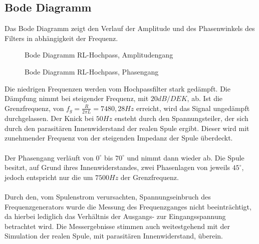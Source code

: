 \subsection{Bode Diagramm}
Das Bode Diagramm zeigt den Verlauf der Amplitude und des Phasenwinkels des Filters in abhängigkeit der Frequenz.
\begin{figure}[H]
  \centering
  \caption{Bode Diagramm RL-Hochpass, Amplitudengang}
\end{figure}
\begin{figure}[H]
  \centering
  \caption{Bode Diagramm RL-Hochpass, Phasengang}
\end{figure}
\noindent
Die niedrigen Frequenzen werden vom Hochpassfilter stark gedämpft. Die Dämpfung nimmt bei steigender Frequenz, mit $20dB/DEK$, ab. Ist die Grenzfrequenz, von
$f_g = \frac{R}{2\pi L} = 7480,28Hz$ erreicht, wird das Signal ungedämpft durchgelassen. Der Knick bei $50Hz$ ensteht durch den Spannungsteiler, der sich durch den
parasitären Innenwiderstand der realen Spule ergibt. Dieser wird mit zunehmender Frequenz von der steigenden Impedanz der Spule überdeckt.\\ \\
Der Phasengang verläuft von $0^\circ$ bis $70^\circ$ und nimmt dann wieder ab. Die Spule besitzt, auf Grund ihres Innenwiderstandes, zwei Phasenlagen von jeweils $45^\circ$,
jedoch entspricht nur die um $7500Hz$ der Grenzfrequenz.\\ \\
Durch den, vom Spulenstrom verursachten, Spannungseinbruch des Frequenzgenerators wurde die Messung des Frequenzganges nicht beeinträchtigt, da hierbei lediglich
das Verhältnis der Ausgangs- zur Eingangsspannung betrachtet wird. Die Messergebnisse stimmen auch weitestgehend mit der Simulation der realen Spule, mit parasitären
Innenwiderstand, überein. \newpage
